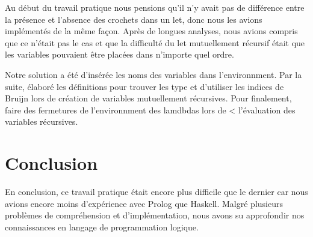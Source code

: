 \documentclass[12pt, letterpaper]{article}
\begin{document}
Au début du travail pratique nous pensions qu'il n'y avait pas de
différence entre la présence et l'absence des crochets dans un let, donc nous 
les avions implémentés de la même façon. Après de longues analyses, nous avions 
compris que ce n'était pas le cas et que la difficulté du let mutuellement 
récursif était que les variables pouvaient être placées dans n'importe quel 
ordre. 

Notre solution a été d'insérée les noms des variables dans l'environnment. 
Par la suite, élaboré les définitions pour trouver les type et d'utiliser les 
indices de Bruijn lors de création de variables mutuellement récursives. Pour 
finalement, faire des fermetures de l'environnment des lamdbdas lors de <
l'évaluation des variables récursives. 

\section*{Conclusion}

En conclusion, ce travail pratique était encore plus difficile que le dernier 
car nous avions encore moins d'expérience avec Prolog que Haskell.
Malgré plusieurs problèmes de compréhension et d'implémentation,
nous avons su approfondir nos connaissances en langage de programmation logique.
\end{document}
